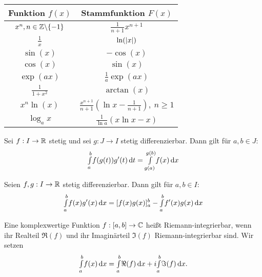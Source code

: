 \documentclass{cheat-sheet}
\begin{document}
\center
\begin{tabular}{ | c | c | }
  \hline
  Funktion $f(x)$ & Stammfunktion $F(x)$ \\ \hline \hline
  $x^n, n \in \mathbb{Z}\backslash\{-1\}$ & $\tfrac{1}{n+1}x^{n+1}$ \\ \hline
  $\tfrac{1}{x}$ & $\ln(\lvert x\rvert)$ \\ \hline
  $\sin(x)$ & $-\cos(x)$ \\ \hline
  $\cos(x)$ & $\sin(x)$ \\ \hline
  $\exp(ax)$ & $\tfrac{1}{a}\exp(ax)$ \\ \hline
  $\tfrac{1}{1 + x^2}$ & $\arctan(x)$ \\ \hline
  $x^n \ln(x)$ & $\tfrac{x^{n+1}}{n+1}(\ln x - \tfrac{1}{n+1}),\ n \ge 1$ \\ \hline
  $\log_a x$ & $\tfrac{1}{\ln a}(x \ln x - x)$ \\ \hline
\end{tabular}

\begin{satz}
  Sei $f : I \to \mathbb{R}$ stetig und sei $g : J \to I$ stetig differenzierbar. Dann gilt für $a, b \in J$:
  \[ {\textstyle \int\limits_{a}^{b}} f(g(t))g'(t) \,\mathrm{d} t = {\textstyle \int\limits_{g(a)}^{g(b)}} f(x) \,\mathrm{d} x \]
\end{satz}

\begin{satz}
  Seien $f, g : I \to \mathbb{R}$ stetig differenzierbar. Dann gilt für $a, b \in I$:
  \[ {\textstyle \int\limits_{a}^{b}} f(x)g'(x) \,\mathrm{d} x = [f(x)g(x)]_a^b - {\textstyle \int\limits_{a}^{b}} f'(x)g(x) \,\mathrm{d} x \]
\end{satz}

\begin{defn}
  Eine komplexwertige Funktion $f : \left[ a, b \right] \to \mathbb{C}$ heißt Riemann-integrierbar, wenn ihr Realteil $\Re(f)$ und ihr Imaginärteil $\Im(f)$ Riemann-integrierbar sind. Wir setzen
  \[ {\textstyle \int\limits_{a}^{b}} f(x) \,\mathrm{d} x = {\textstyle \int\limits_{a}^{b}} \Re(f) \,\mathrm{d} x + i {\textstyle \int\limits_{a}^{b}} \Im(f) \,\mathrm{d} x. \]
\end{defn}
\end{document}
